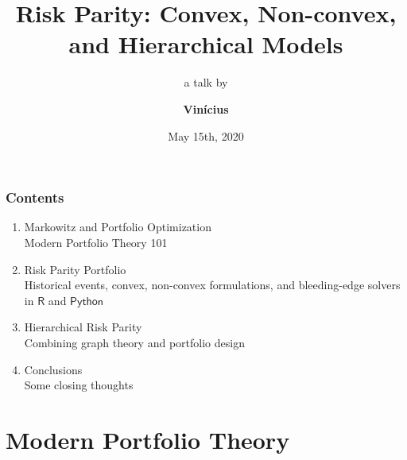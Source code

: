 \documentclass[aspectratio=169]{beamer}
\title{Risk Parity: Convex, Non-convex, and Hierarchical Models}
\subtitle{a talk by}
\author{\textbf{Vin\'icius}}
\date{May 15th, 2020}
\begin{document}
	\setcounter{showProgressBar}{0}
	\setcounter{showSlideNumbers}{0}

	\frame{\titlepage}

        \begin{frame}
          \frametitle{Contents}
              \vspace{.5cm}
          \begin{enumerate}
            \item Markowitz and Portfolio Optimization
             \\ \textcolor{ExecusharesGrey}{\footnotesize\hspace{1em} Modern Portfolio Theory 101}
            \item Risk Parity Portfolio
             \\ \textcolor{ExecusharesGrey}{\footnotesize\hspace{1em} Historical events, convex, non-convex formulations,
             and bleeding-edge solvers in $\mathsf{R}$ and $\mathsf{Python}$}
            \item Hierarchical Risk Parity
              \\ \textcolor{ExecusharesGrey}{\footnotesize\hspace{1em} Combining graph theory and portfolio design}
            \item Conclusions
              \\ \textcolor{ExecusharesGrey}{\footnotesize\hspace{1em} Some closing thoughts}
          \end{enumerate}
        \end{frame}



	\setcounter{showSlideNumbers}{0}
        \section{Modern Portfolio Theory}
	\setcounter{framenumber}{0}
	\setcounter{showProgressBar}{1}
	\setcounter{showSlideNumbers}{1}
\end{document}

